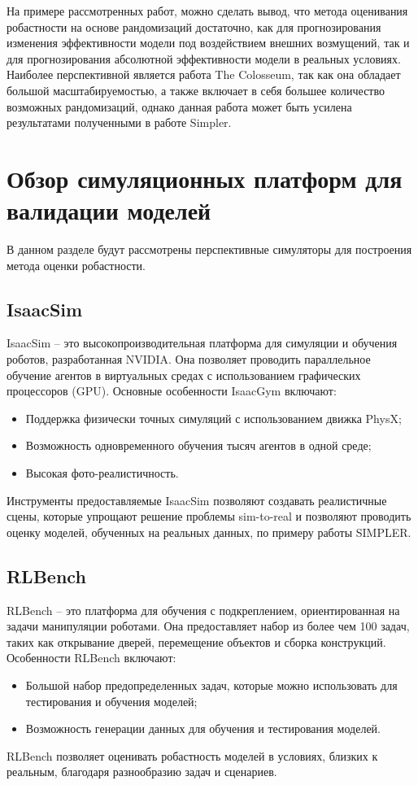     На примере рассмотренных работ, можно сделать вывод, что метода оценивания робастности на основе рандомизаций достаточно, как для прогнозирования изменения эффективности модели под воздействием внешних возмущений, так и для прогнозирования абсолютной эффективности модели в реальных условиях. Наиболее перспективной является работа The Colosseum, так как она обладает большой масштабируемостью, а также включает в себя большее количество возможных рандомизаций, однако данная работа может быть усилена результатами полученными в работе Simpler. 

    \section{Обзор симуляционных платформ для валидации моделей}

    В данном разделе будут рассмотрены перспективные симуляторы для построения метода оценки робастности.

    \subsection{IsaacSim}
    IsaacSim \cite{nvidia_isaac_sim} -- это высокопроизводительная платформа для симуляции и обучения роботов, разработанная NVIDIA. Она позволяет проводить параллельное обучение агентов в виртуальных средах с использованием графических процессоров (GPU). Основные особенности IsaacGym включают:
    \begin{itemize}
        \item Поддержка физически точных симуляций с использованием движка PhysX;
        \item Возможность одновременного обучения тысяч агентов в одной среде;
        \item Высокая фото-реалистичность.
    \end{itemize}
    
    Инструменты предоставляемые IsaacSim позволяют создавать реалистичные сцены, которые упрощают решение проблемы sim-to-real и позволяют проводить оценку моделей, обученных на реальных данных, по примеру работы SIMPLER.
    
    \subsection{RLBench}
    RLBench \cite{james2020rlbench} -- это платформа для обучения с подкреплением, ориентированная на задачи манипуляции роботами. Она предоставляет набор из более чем 100 задач, таких как открывание дверей, перемещение объектов и сборка конструкций. Особенности RLBench включают:
    \begin{itemize}
        \item Большой набор предопределенных задач, которые можно использовать для тестирования и обучения моделей;
        \item Возможность генерации данных для обучения и тестирования моделей.
    \end{itemize}
    RLBench позволяет оценивать робастность моделей в условиях, близких к реальным, благодаря разнообразию задач и сценариев.
    
